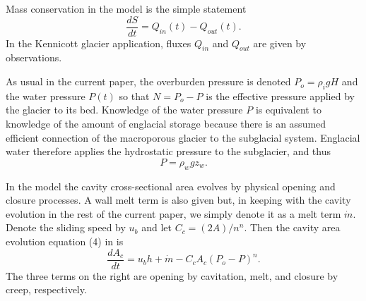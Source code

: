 \documentclass[11pt,final]{amsart}
\begin{document}
Mass conservation in the model is the simple statement  \citep{Bartholomausetal2008}
\begin{equation}
\frac{dS}{dt} = Q_{in}(t) - Q_{out}(t). \label{eq:barth:massconserve}
\end{equation}
In the Kennicott glacier application, fluxes $Q_{in}$ and $Q_{out}$ are given by observations.

As usual in the current paper, the overburden pressure is denoted $P_o=\rho_i g H$ and the water pressure $P(t)$ so that $N=P_o-P$ is the effective pressure applied by the glacier to its bed.  Knowledge of the water pressure $P$ is equivalent to knowledge of the amount of englacial storage because there is an assumed efficient connection of the macroporous glacier to the subglacial system.  Englacial water therefore applies the hydrostatic pressure to the subglacier, and thus
\begin{equation}
P = \rho_w g z_w.  \label{eq:barth:englacialpressure}
\end{equation}

In the \cite{Bartholomausetal2011} model the cavity cross-sectional area evolves by physical opening and closure processes.  A wall melt term is also given but, in keeping with the cavity evolution in the rest of the current paper, we simply denote it as a melt term $\dot m$.  Denote the sliding speed by $u_b$ and let $C_c = (2 A)/n^n$.  Then the cavity area evolution equation (4) in \cite{Bartholomausetal2011} is
\begin{equation}
\frac{dA_c}{dt} = u_b h + \dot m - C_c A_c (P_o-P)^n.  \label{eq:barth:cavityevolution}
\end{equation}
The three terms on the right are opening by cavitation, melt, and closure by creep, respectively.
\end{document}
